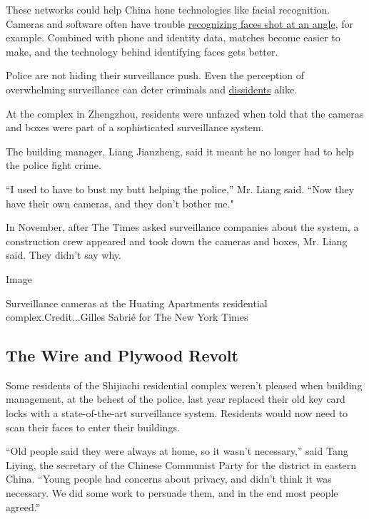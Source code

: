 These networks could help China hone technologies like facial
recognition. Cameras and software often have trouble
\href{https://www.nytimes3xbfgragh.onion/2019/07/13/technology/databases-faces-facial-recognition-technology.html}{recognizing
faces shot at an angle}, for example. Combined with phone and identity
data, matches become easier to make, and the technology behind
identifying faces gets better.

Police are not hiding their surveillance push. Even the perception of
overwhelming surveillance can deter criminals and
\href{https://www.nytimes3xbfgragh.onion/2020/07/30/world/asia/coronavirus-china-qurantine.html}{dissidents}
alike.

At the complex in Zhengzhou, residents were unfazed when told that the
cameras and boxes were part of a sophisticated surveillance system.

The building manager, Liang Jianzheng, said it meant he no longer had to
help the police fight crime.

``I used to have to bust my butt helping the police,'' Mr. Liang said.
``Now they have their own cameras, and they don't bother me."

In November, after The Times asked surveillance companies about the
system, a construction crew appeared and took down the cameras and
boxes, Mr. Liang said. They didn't say why.

Image

Surveillance cameras at the Huating Apartments residential
complex.Credit...Gilles Sabrié for The New York Times

\hypertarget{the-wire-and-plywood-revolt}{%
\subsection{The Wire and Plywood
Revolt}\label{the-wire-and-plywood-revolt}}

Some residents of the Shijiachi residential complex weren't pleased when
building management, at the behest of the police, last year replaced
their old key card locks with a state-of-the-art surveillance system.
Residents would now need to scan their faces to enter their buildings.

``Old people said they were always at home, so it wasn't necessary,''
said Tang Liying, the secretary of the Chinese Communist Party for the
district in eastern China. ``Young people had concerns about privacy,
and didn't think it was necessary. We did some work to persuade them,
and in the end most people agreed.''

